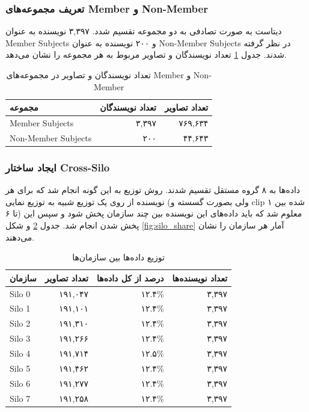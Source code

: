 \subsubsection{تعریف مجموعه‌های Member و Non-Member}

دیتاست به صورت تصادفی به دو مجموعه تقسیم شدد. ۳,۳۹۷ نویسنده به عنوان Member Subjects و ۲۰۰ نویسنده به عنوان Non-Member Subjects در نظر گرفته شدند.  جدول \ref{tab:member_nonmember} تعداد نویسندگان و تصاویر مربوط به هر مجموعه را نشان می‌دهد.

\begin{table}[H]
	\centering
	\caption{تعداد نویسندگان و تصاویر در مجموعه‌های Member و Non-Member}
	\label{tab:member_nonmember}
	\begin{tabular}{|l|r|r|}
		\hline
		\textbf{مجموعه} & \textbf{تعداد نویسندگان} & \textbf{تعداد تصاویر} \\
		\hline
		Member Subjects & ۳,۳۹۷ & ۷۶۹,۶۳۴ \\
		Non-Member Subjects & ۲۰۰ & ۴۴,۶۴۳ \\
		\hline
	\end{tabular}
\end{table}

\subsubsection{ایجاد ساختار Cross-Silo}

داده‌ها به  ۸ گروه مستقل تقسیم شدند. روش توزیع به این گونه انجام شد که برای هر نویسنده از روی یک توزیع شبیه به توزیع نمایی (ولی بصورت گسسته و clip شده بین ۱ تا ۶) معلوم شد که باید داده‌های این نویسنده بین چند سازمان پخش شود و سپس این پخش شدن انجام شد. جدول \ref{tab:silo_stats} و شکل \ref{fig:silo_share} آمار هر سازمان را نشان می‌دهند.

\begin{table}[H]
	\centering
	\caption{توزیع داده‌ها بین سازمان‌ها}
	\label{tab:silo_stats}
	\begin{tabular}{|l|r|r|r|}
		\hline
		\textbf{سازمان} & \textbf{تعداد تصاویر} & \textbf{درصد از کل داده‌ها} & \textbf{تعداد نویسنده‌ها} \\
		\hline
		Silo 0 & ۱۹۱,۰۴۷ & ۱۲.۴\% & ۳,۳۹۷ \\
		Silo 1 & ۱۹۱,۱۰۱ & ۱۲.۴\% & ۳,۳۹۷ \\
		Silo 2 & ۱۹۱,۳۱۰ & ۱۲.۴\% & ۳,۳۹۷ \\
		Silo 3 & ۱۹۱,۲۶۶ & ۱۲.۴\% & ۳,۳۹۷ \\
		Silo 4 & ۱۹۱,۷۱۴ & ۱۲.۵\% & ۳,۳۹۷ \\
		Silo 5 & ۱۹۱,۴۶۲ & ۱۲.۴\% & ۳,۳۹۷ \\
		Silo 6 & ۱۹۱,۲۷۷ & ۱۲.۴\% & ۳,۳۹۷ \\
		Silo 7 & ۱۹۱,۲۵۸ & ۱۲.۴\% & ۳,۳۹۷ \\
		\hline
	\end{tabular}
\end{table}

